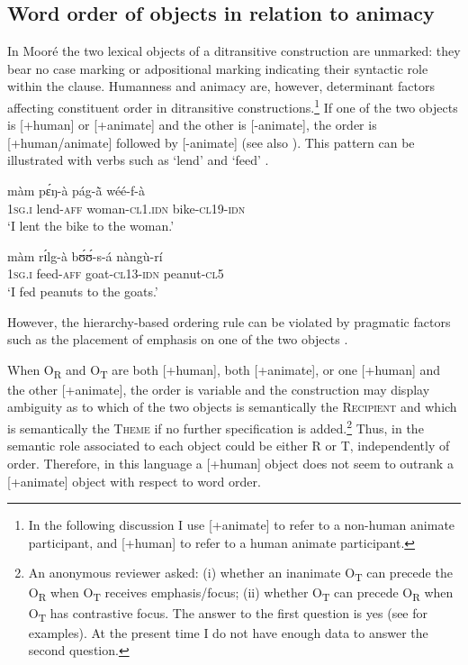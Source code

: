 \documentclass[output=paper]{langsci/langscibook}
\begin{document}
\subsection{Word order of objects in relation to animacy}\label{§4.2:word.pacchiarotti}

In Mooré the two lexical objects of a ditransitive construction are unmarked: they bear no case marking or adpositional marking indicating their syntactic role within the clause. Humanness and animacy are, however, determinant factors affecting constituent order in ditransitive constructions.\footnote{In the following discussion I use [+animate] to refer to a non-human animate participant, and [+human] to refer to a human animate participant.} If one of the two objects is [+human] or [+animate] and the other is [-animate], the order is [+human/animate] followed by [-animate] (see also \citealt[394]{canu1974}). This pattern can be illustrated with verbs such as `lend'  and `feed' .

\ea
\label{ex:14.pacchiarotti}
\gll màm    pɛ́ŋ-à         pág-\`{ã}      wéé-f-à\\
\textsc{1sg.i}    lend-\textsc{aff}        woman-\textsc{cl1.idn}  bike-\textsc{cl19-idn}\\
\glt `I lent the bike to the woman.'
\z

\ea
\label{ex:15.pacchiarotti}
\gll màm    rɪ́lg-à      bʊ́ʊ́-s-á    nàngù-rí \\
\textsc{1sg.i}    feed-\textsc{aff}    goat-\textsc{cl13-idn}  peanut-\textsc{cl5}\\
\glt `I fed peanuts to the goats.'
\z

However, the hierarchy-based ordering rule can be violated by pragmatic factors such as the placement of emphasis on one of the two objects \citep[375]{kabore1985}.

When O\textsubscript{R} and O\textsubscript{T} are both [+human], both [+animate], or one [+human] and the other [+animate],  the order is variable and the construction may display ambiguity as to which of the two objects is semantically the \textsc{Recipient} and which is semantically the \textsc{Theme} if no further specification is added.\footnote{An anonymous reviewer asked: (i) whether an inanimate O\textsubscript{T} can precede the O\textsubscript{R} when O\textsubscript{T} receives emphasis/focus; (ii) whether O\textsubscript{T} can precede O\textsubscript{R} when O\textsubscript{T} has contrastive focus. The answer to the first question is yes (see \citealt[375]{kabore1985} for examples). At the present time I do not have enough data to answer the second question.} Thus, in  the semantic role associated to each object could be either R or T, independently of order. Therefore, in this language a [+human] object does not seem to outrank a [+animate] object with respect to word order.
\end{document}
